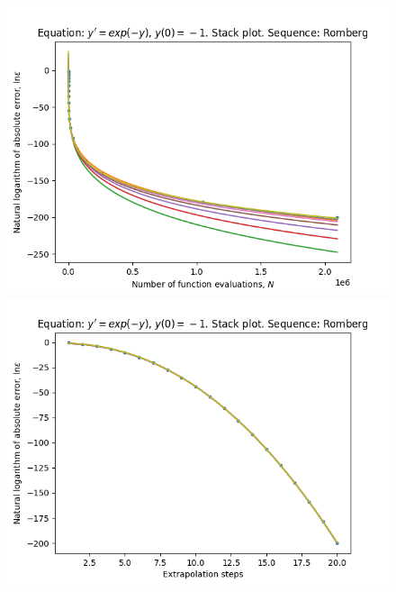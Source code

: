 \begin{figure}[H]
\centering
\begin{minipage}{0.45\textwidth}
\centering
\includegraphics[scale=0.45]{../results/emr_plots/ln_em1_hp_romberg_stack.png}
\end{minipage}
\begin{minipage}{0.45\textwidth}
\centering
\includegraphics[scale=0.45]{../results/emr_plots/ln_em1_hp_romberg_steps_stack.png}
\end{minipage}
\end{figure}

